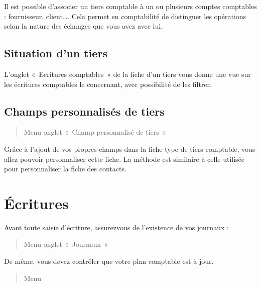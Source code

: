 \documentclass[a4paper,10pt,oneside,french]{sphinxmanual}
\begin{document}
\sphinxAtStartPar
Il est possible d’associer un tiers comptable à un ou plusieurs comptes comptables : fournisseur, client…. Cela permet en comptabilité de distinguer les opérations selon la nature des échanges que vous avez avec lui.


\subsection{Situation d’un tiers}
\label{\detokenize{accounting/third:situation-d-un-tiers}}
\sphinxAtStartPar
L’onglet « Ecritures comptables » de la fiche d’un tiers vous donne une vue sur les écritures comptables le concernant,
avec possibilité de les filtrer.

\noindent{}


\subsection{Champs personnalisés de tiers}
\label{\detokenize{accounting/third:champs-personnalises-de-tiers}}\begin{quote}

\sphinxAtStartPar
Menu  \sphinxhyphen{} onglet « Champ personnalisé de tiers »
\end{quote}

\sphinxAtStartPar
Grâce à l’ajout de vos propres champs dans la fiche type de tiers comptable, vous allez pouvoir personnaliser cette fiche.
La méthode est similaire à celle utilisée pour personnaliser la fiche des contacts.

\sphinxstepscope


\section{Écritures}
\label{\detokenize{accounting/entity:ecritures}}\label{\detokenize{accounting/entity::doc}}
\sphinxAtStartPar
Avant toute saisie d’écriture, assurez\sphinxhyphen{}vous de l’existence de vos journaux :
\begin{quote}

\sphinxAtStartPar
Menu  onglet « Journaux »
\end{quote}

\sphinxAtStartPar
De même, vous devez contrôler que votre plan comptable est à jour.
\begin{quote}

\sphinxAtStartPar
Menu 
\end{quote}
\end{document}

